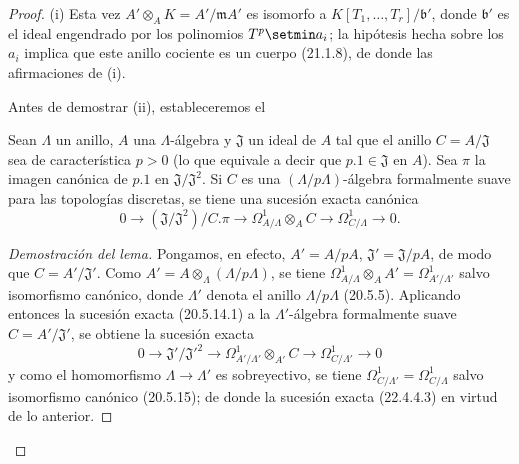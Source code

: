 \begin{proof}
(i) Esta vez $A'\otimes_AK=A'/\mathfrak mA'$ es isomorfo a
$K[T_1,\ldots,T_r]/\mathfrak b'$, donde $\mathfrak b'$ es el ideal engendrado
por los polinomios $T^p\setmin a_i$; la hipótesis hecha sobre los $a_i$ implica que
este anillo cociente es un cuerpo (21.1.8), de donde las afirmaciones de (i).

Antes de demostrar (ii), estableceremos el

\begin{lemma}[22.4.4.2]
\label{0.22.4.4.2-fr}
Sean $\Lambda$ un anillo, $A$ una $\Lambda$-álgebra y $\mathfrak J$ un
ideal de $A$ tal que el anillo $C=A/\mathfrak J$ sea de característica
$p>0$ (lo que equivale a decir que $p.1\in\mathfrak J$ en $A$). Sea
$\pi$ la imagen canónica de $p.1$ en
$\mathfrak J/\mathfrak J^2$. Si $C$ es una $(\Lambda/p\Lambda)$-álgebra
formalmente suave para las topologías discretas, se tiene una sucesión exacta
canónica
\begin{equation}
\label{0.22.4.4.3-fr}
  0\longrightarrow(\mathfrak J/\mathfrak J^2)/C.\pi
  \longrightarrow\Omega^1_{A/\Lambda}\otimes_AC
  \longrightarrow\Omega^1_{C/\Lambda}\longrightarrow0.
  \tag{22.4.4.3}
\end{equation}
\end{lemma}

\begin{proof}[Demostración del lema]
Pongamos, en efecto, $A'=A/pA$, $\mathfrak J'=\mathfrak J/pA$, de modo que
$C=A'/\mathfrak J'$. Como
$A'=A\otimes_\Lambda(\Lambda/p\Lambda)$, se tiene
$\Omega^1_{A/\Lambda}\otimes_AA'=\Omega^1_{A'/\Lambda'}$ salvo
isomorfismo canónico, donde $\Lambda'$ denota el anillo
$\Lambda/p\Lambda$ (20.5.5). Aplicando entonces la sucesión exacta (20.5.14.1) a
la $\Lambda'$-álgebra formalmente suave $C=A'/\mathfrak J'$, se obtiene la
sucesión exacta
\[
  0\longrightarrow\mathfrak J'/\mathfrak J'^2
  \longrightarrow\Omega^1_{A'/\Lambda'}\otimes_{A'}C
  \longrightarrow\Omega^1_{C/\Lambda'}\longrightarrow0
\]
y como el homomorfismo $\Lambda\to\Lambda'$ es sobreyectivo, se tiene
$\Omega^1_{C/\Lambda'}=\Omega^1_{C/\Lambda}$ salvo isomorfismo canónico
(20.5.15); de donde la sucesión exacta (22.4.4.3) en virtud de lo anterior.
\end{proof}


\end{proof}
